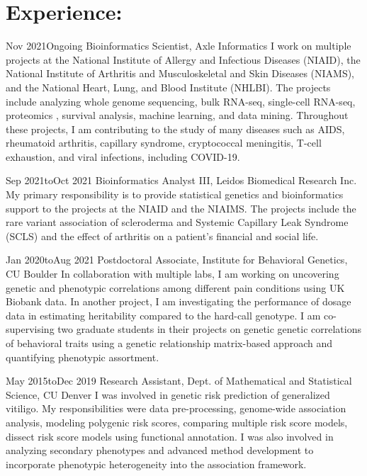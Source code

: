 \section{Experience:}

\jobs
{Nov 2021}{}{Ongoing}
{Bioinformatics Scientist, Axle Informatics}
{I work on multiple projects at the National Institute of Allergy and Infectious Diseases (NIAID), the National Institute of Arthritis and Musculoskeletal and Skin Diseases (NIAMS), and the National Heart, Lung, and Blood Institute (NHLBI). The projects include analyzing whole genome sequencing, bulk RNA-seq, single-cell RNA-seq, proteomics , survival analysis, machine learning, and data mining. Throughout these projects, I am contributing to the study of many diseases such as AIDS, rheumatoid arthritis, capillary syndrome, cryptococcal meningitis, T-cell exhaustion, and viral infections, including COVID-19.}

\vspace{-0.6cm}

\jobs
{Sep 2021}{to}{Oct 2021}
{Bioinformatics Analyst III, Leidos Biomedical Research Inc.}
{My primary responsibility is to provide statistical genetics and bioinformatics support to the projects at the NIAID and the NIAIMS. The projects include the rare variant association of scleroderma and Systemic Capillary Leak Syndrome (SCLS) and the effect of arthritis on a patient's financial and social life.}

\vspace{-0.6cm}

\jobs
{Jan 2020}{to}{Aug 2021}
{Postdoctoral Associate, Institute for Behavioral Genetics, CU Boulder}
{In collaboration with multiple labs, I am working on uncovering genetic and phenotypic correlations among different pain conditions using UK Biobank data. In another project, I am investigating the performance of dosage data in estimating heritability compared to the hard-call genotype. I am co-supervising two graduate students in their projects on genetic genetic correlations of behavioral traits using a genetic relationship matrix-based approach and quantifying phenotypic assortment.}

\vspace{-0.6cm}

\jobs
{May 2015}{to}{Dec 2019}
{Research Assistant, Dept. of Mathematical and Statistical Science, CU Denver}
{I was involved in genetic risk prediction of generalized vitiligo. My responsibilities were data pre-processing, genome-wide association analysis, modeling polygenic risk scores, comparing multiple risk score models, dissect risk score models using functional annotation. I was also involved in analyzing secondary phenotypes and advanced method development to incorporate phenotypic heterogeneity into the association framework.}

